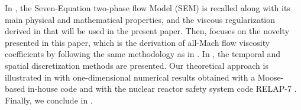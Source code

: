 \documentclass[preprint,10pt]{elsarticle}
\begin{document}
%
%
In , the Seven-Equation two-phase flow Model (SEM) is recalled along with its main 
physical and mathematical properties, and the viscous regularization derived in \cite{Marco_paper_sem} that will be used in the present paper. Then,  focuses on the novelty presented in this paper, which is the derivation of all-Mach flow viscosity coefficients by following the same methodology as in \cite{DelchiniCompFluid2014-euler}.
In , the temporal and spatial discretization methods are presented. 
Our theoretical approach is illustrated in  with one-dimensional numerical results obtained with a Moose-based in-house code and with the nuclear reactor safety system code RELAP-7 \cite{Berry_2014}.  
Finally, we conclude in .
%

%
\end{document}
